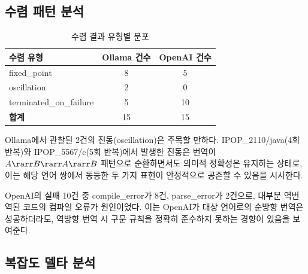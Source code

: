 \subsection{수렴 패턴 분석}\label{ssec:convergence-pattern}

\begin{table}[htbp]
  \centering
  \caption{수렴 결과 유형별 분포}\label{tab:convergence}
  \begin{tabular}{@{}l
      S[table-format=2.0]
      S[table-format=2.0]@{}}
    \toprule
    {수렴 유형}              & {Ollama 건수} & {OpenAI 건수}  \\
    \midrule
    fixed\_point             & 8  & 5  \\
    oscillation              & 2  & 0  \\
    terminated\_on\_failure  & 5  & 10 \\
    \midrule
    \textbf{합계}            & 15 & 15 \\
    \bottomrule
  \end{tabular}
\end{table}

Ollama에서 관찰된 2건의 진동(oscillation)은 주목할 만하다.
IPOP\_2110/java(4회 반복)와 IPOP\_5567/c(5회 반복)에서 발생한 진동은
번역이 $A \rarr B \rarr A \rarr B$ 패턴으로 순환하면서도 의미적 정확성은
유지하는 상태로, 이는 해당 언어 쌍에서 동등한 두 가지 표현이 안정적으로
공존할 수 있음을 시사한다.

OpenAI의 실패 10건 중 compile\_error가 8건, parse\_error가 2건으로,
대부분 역번역된 \cpp{} 코드의 컴파일 오류가 원인이었다.
이는 OpenAI가 대상 언어로의 순방향 번역은 성공하더라도, 역방향 번역 시
\cpp{} 구문 규칙을 정확히 준수하지 못하는 경향이 있음을 보여준다.

\subsection{복잡도 델타 분석}\label{ssec:complexity}

